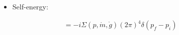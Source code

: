 \documentclass[12pt,a4paper]{article}
\begin{document}
\begin{figure}
\caption{}
\label{a fig}
\begin{itemize}
\item Self-energy:

\[
\qquad
\begin{aligned}
= -i\Sigma(p,\mathring{m},\mathring{g})(2\pi)^4 \delta(p_f - p_i) 
\end{aligned}
\]

\end{itemize}
\end{figure}
\end{document}
